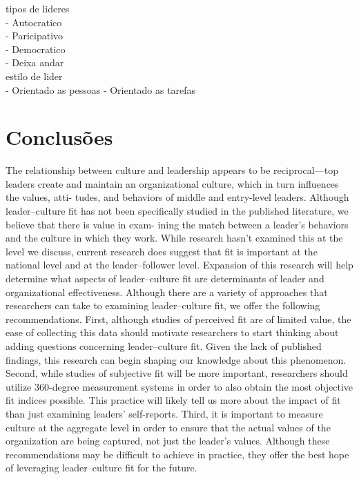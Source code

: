 tipos de lideres\\
- Autocratico\\
- Paricipativo \\
- Democratico \\
- Deixa andar\\

estilo de lider\\
- Orientado as pessoas
- Orientado as tarefas\\





\newpage
\section{Conclusões}
The relationship between culture and leadership appears to be reciprocal—top leaders
create and maintain an organizational culture, which in turn influences the values, atti-
tudes, and behaviors of middle and entry-level leaders. Although leader–culture fit has not
been specifically studied in the published literature, we believe that there is value in exam-
ining the match between a leader’s behaviors and the culture in which they work. While
research hasn’t examined this at the level we discuss, current research does suggest that fit
is important at the national level and at the leader–follower level. Expansion of this
research will help determine what aspects of leader–culture fit are determinants of leader
and organizational effectiveness.
Although there are a variety of approaches that researchers can take to examining
leader–culture fit, we offer the following recommendations. First, although studies of
perceived fit are of limited value, the ease of collecting this data should motivate researchers
to start thinking about adding questions concerning leader–culture fit. Given the lack of
published findings, this research can begin shaping our knowledge about this phenomenon.
Second, while studies of subjective fit will be more important, researchers should utilize
360-degree measurement systems in order to also obtain the most objective fit indices
possible. This practice will likely tell us more about the impact of fit than just examining
leaders’ self-reports. Third, it is important to measure culture at the aggregate level in
order to ensure that the actual values of the organization are being captured, not just the
leader’s values. Although these recommendations may be difficult to achieve in practice,
they offer the best hope of leveraging leader–culture fit for the future.\\

